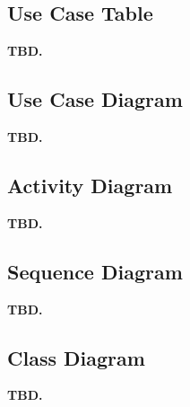 \subsection{Use Case Table}
\label{sec:use-case-table}
\textbf{TBD.}

\subsection{Use Case Diagram}
\label{sec:use-case-diagram}
\textbf{TBD.}

\subsection{Activity Diagram}
\label{sec:activity-diagram}
\textbf{TBD.}

\subsection{Sequence Diagram}
\label{sec:sequence-diagram}
\textbf{TBD.}

\subsection{Class Diagram}
\label{sec:class-diagram}
\textbf{TBD.}
